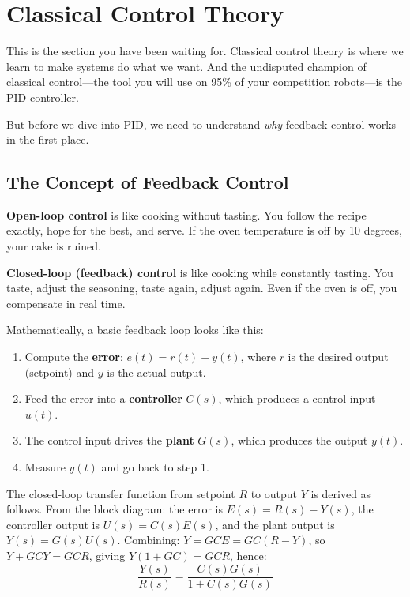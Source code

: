 \section{Classical Control Theory}

This is the section you have been waiting for. Classical control theory is where we learn to make systems do what we want. And the undisputed champion of classical control---the tool you will use on 95\% of your competition robots---is the PID controller.

But before we dive into PID, we need to understand \textit{why} feedback control works in the first place.

\subsection{The Concept of Feedback Control}

\textbf{Open-loop control} is like cooking without tasting. You follow the recipe exactly, hope for the best, and serve. If the oven temperature is off by 10 degrees, your cake is ruined.

\textbf{Closed-loop (feedback) control} is like cooking while constantly tasting. You taste, adjust the seasoning, taste again, adjust again. Even if the oven is off, you compensate in real time.

Mathematically, a basic feedback loop looks like this:

\begin{enumerate}
    \item Compute the \textbf{error}: $e(t) = r(t) - y(t)$, where $r$ is the desired output (setpoint) and $y$ is the actual output.
    \item Feed the error into a \textbf{controller} $C(s)$, which produces a control input $u(t)$.
    \item The control input drives the \textbf{plant} $G(s)$, which produces the output $y(t)$.
    \item Measure $y(t)$ and go back to step 1.
\end{enumerate}

The closed-loop transfer function from setpoint $R$ to output $Y$ is derived as follows.
From the block diagram: the error is $E(s) = R(s) - Y(s)$, the controller output is $U(s) = C(s)E(s)$, and the plant output is $Y(s) = G(s)U(s)$. Combining: $Y = GCE = GC(R - Y)$, so $Y + GCY = GCR$, giving $Y(1 + GC) = GCR$, hence:
\begin{equation}
\frac{Y(s)}{R(s)} = \frac{C(s)G(s)}{1 + C(s)G(s)}
\end{equation}

